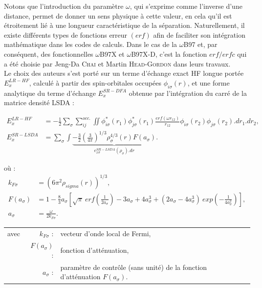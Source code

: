 {{Notons que l'introduction du paramètre $\omega$, qui s'exprime comme l'inverse d'une distance, permet de donner un sens physique à cette valeur, en cela qu'il est étroitement lié à une longueur caractéristique de la séparation.
Naturellement, il existe différents types de fonctions erreur $(erf)$ afin de faciliter son intégration mathématique dans les codes de calculs. Dans le cas de la $\omega$B97 \cite{chai2008long} et, par conséquent, des fonctionnelles $\omega$B97X et $\omega$B97X-D, c'est la fonction $erf/erfc$ qui a été choisie par Jeng-Da \textsc{Chai} et Martin \textsc{Head-Gordon} dans leurs travaux. \\

Le choix des auteurs s'est porté sur un terme d'échange exact HF longue portée $E_{x}^{LR-HF}$, calculé à partir des spin-orbitales occupées $\phi_{i \sigma}(r)$, et une forme analytique du terme d'échange $E_{x}^{SR-DFA}$ obtenue par l'intégration du carré de la matrice densité LSDA :

\begin{align}
E_{x}^{LR-HF} &= -\frac{1}{2} \sum_{\sigma} \sum_{ij}^{occ.} \iint \phi_{i \sigma}^{*}(r_{1}) \phi_{j \sigma}^{*}(r_{1}) \frac{erf(\omega r_{12})}{r_{12}} \phi_{i \sigma}(r_{2}) \phi_{j \sigma}(r_{2}).dr_{1}.dr_{2}, \\
E_{x}^{SR-LSDA} &= \sum_{\sigma} \int \underbrace{-\frac{3}{2}\left(\frac{3}{4\pi}\right)^{1/3}\rho_{\sigma}^{4/3} (r) F(a_{\sigma})}_{e_{x \sigma}^{SR-LSDA} (\rho_{\sigma}) .dr}.
\end{align}

\noindent où :
\begin{align}
k_{F \sigma}&=(6\pi^{2}\rho_{sigma}(r))^{1/3},\nonumber\\
F(a_{\sigma})&=1-\frac{8}{3}a_{\sigma}\left[\sqrt{\pi}\: erf\left(\frac{1}{2a_{\sigma}}\right)-3a_{\sigma}+4a_{\sigma}^{3}+(2a_{\sigma}-4a_{\sigma}^{3}) \: exp\left(-\frac{1}{4a_{\sigma}^{2}}\right)\right],\nonumber\\
a_{\sigma}&=\frac{\omega}{2k_{F\sigma}}.\nonumber
\end{align}

\begin{flushleft}
\begin{tabular}{@{}lrp{10cm}}
avec & $k_{F\sigma}$ : & vecteur d'onde local de Fermi,\\
& $F(a_{\sigma})$ : & fonction d'atténuation,\\
& $a_{\sigma}$ : & paramètre de contrôle (sans unité) de la fonction d'atténuation $F(a_{\sigma})$.
\end{tabular}
\end{flushleft}

}}
